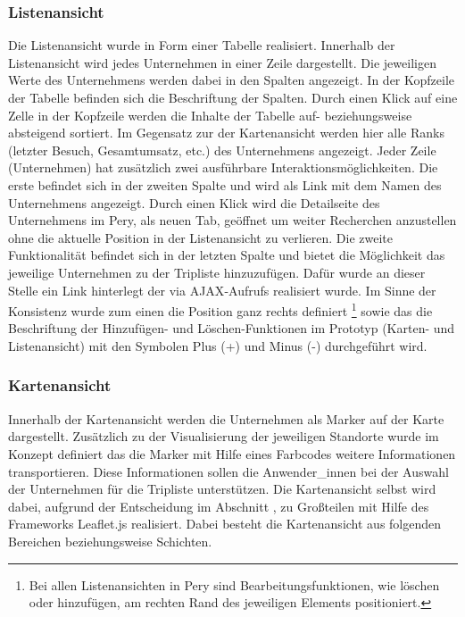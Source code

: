 \documentclass[Bachelorarbeit.tex]{subfiles}
\begin{document}
\subsubsection*{Listenansicht}
Die Listenansicht wurde in Form einer Tabelle realisiert.
Innerhalb der Listenansicht wird jedes Unternehmen in einer Zeile dargestellt.
Die jeweiligen Werte des Unternehmens werden dabei in den Spalten angezeigt.
In der Kopfzeile der Tabelle befinden sich die Beschriftung der Spalten.
Durch einen Klick auf eine Zelle in der Kopfzeile werden die Inhalte der Tabelle auf- beziehungsweise absteigend sortiert.
Im Gegensatz zur der Kartenansicht werden hier alle Ranks (letzter Besuch, Gesamtumsatz, etc.) des Unternehmens angezeigt. 
Jeder Zeile (Unternehmen) hat zusätzlich zwei ausführbare Interaktionsmöglichkeiten.
Die erste befindet sich in der zweiten Spalte und wird als Link mit dem Namen des Unternehmens angezeigt. 
Durch einen Klick wird die Detailseite des Unternehmens im Pery, als neuen Tab, geöffnet um weiter Recherchen anzustellen ohne die aktuelle Position in der Listenansicht zu verlieren.
Die zweite Funktionalität befindet sich in der letzten Spalte und bietet die Möglichkeit das jeweilige Unternehmen zu der Tripliste hinzuzufügen.
Dafür wurde an dieser Stelle ein Link hinterlegt der via \ac{AJAX}-Aufrufs realisiert wurde.
Im Sinne der Konsistenz wurde zum einen die Position ganz rechts definiert
	\footnote{Bei allen Listenansichten in Pery sind Bearbeitungsfunktionen, wie löschen oder hinzufügen, am rechten Rand des jeweiligen Elements positioniert.}
sowie das die Beschriftung der Hinzufügen- und Löschen-Funktionen im Prototyp (Karten- und Listenansicht) mit den Symbolen Plus (+) und Minus (-) durchgeführt wird.

\subsubsection*{Kartenansicht} 
Innerhalb der Kartenansicht werden die Unternehmen als Marker auf der Karte dargestellt. 
Zusätzlich zu der Visualisierung der jeweiligen Standorte wurde im Konzept definiert das die Marker mit Hilfe eines Farbcodes weitere Informationen transportieren.
Diese Informationen sollen die Anwender\_innen bei der Auswahl der Unternehmen für die Tripliste unterstützen.
Die Kartenansicht selbst wird dabei, aufgrund der Entscheidung im Abschnitt , zu Großteilen mit Hilfe des Frameworks Leaflet.js realisiert.
Dabei besteht die Kartenansicht aus folgenden Bereichen beziehungsweise Schichten.
\end{document}
